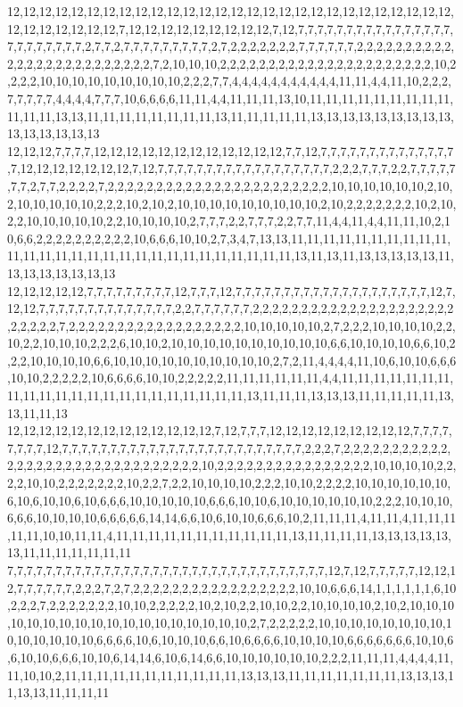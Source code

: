 12,12,12,12,12,12,12,12,12,12,12,12,12,12,12,12,12,12,12,12,12,12,12,12,12,12,12,12,12,12,12,12,12,12,12,7,12,12,12,12,12,12,12,12,12,7,12,7,7,7,7,7,7,7,7,7,7,7,7,7,7,7,7,7,7,7,7,7,7,7,7,2,7,7,2,7,7,7,7,7,7,7,7,7,2,7,2,2,2,2,2,2,2,7,7,7,7,7,7,2,2,2,2,2,2,2,2,2,2,2,2,2,2,2,2,2,2,2,2,2,2,2,2,2,7,2,10,10,10,2,2,2,2,2,2,2,2,2,2,2,2,2,2,2,2,2,2,2,2,2,2,10,2,2,2,2,10,10,10,10,10,10,10,10,10,2,2,2,7,7,4,4,4,4,4,4,4,4,4,4,4,11,11,4,4,11,10,2,2,2,7,7,7,7,7,4,4,4,4,7,7,7,10,6,6,6,6,11,11,4,4,11,11,11,13,10,11,11,11,11,11,11,11,11,11,11,11,11,13,13,11,11,11,11,11,11,11,11,13,11,11,11,11,11,13,13,13,13,13,13,13,13,13,13,13,13,13,13,13
12,12,12,7,7,7,7,12,12,12,12,12,12,12,12,12,12,12,12,7,7,12,7,7,7,7,7,7,7,7,7,7,7,7,7,7,7,12,12,12,12,12,12,12,7,12,7,7,7,7,7,7,7,7,7,7,7,7,7,7,7,7,7,7,2,2,2,7,7,7,2,2,7,7,7,7,7,7,7,2,7,7,2,2,2,2,7,2,2,2,2,2,2,2,2,2,2,2,2,2,2,2,2,2,2,2,2,2,2,2,10,10,10,10,10,10,2,10,2,10,10,10,10,10,2,2,2,10,2,10,2,10,10,10,10,10,10,10,10,10,2,10,2,2,2,2,2,2,2,10,2,10,2,2,10,10,10,10,10,2,2,10,10,10,10,2,7,7,7,2,2,7,7,7,2,2,7,7,11,4,4,11,4,4,11,11,10,2,10,6,6,2,2,2,2,2,2,2,2,2,2,10,6,6,6,10,10,2,7,3,4,7,13,13,11,11,11,11,11,11,11,11,11,11,11,11,11,11,11,11,11,11,11,11,11,11,11,11,11,11,11,11,13,11,13,11,13,13,13,13,13,11,13,13,13,13,13,13,13
12,12,12,12,12,7,7,7,7,7,7,7,7,7,12,7,7,7,12,7,7,7,7,7,7,7,7,7,7,7,7,7,7,7,7,7,7,7,7,12,7,12,12,7,7,7,7,7,7,7,7,7,7,7,7,7,7,2,2,7,7,7,7,7,7,2,2,2,2,2,2,2,2,2,2,2,2,2,2,2,2,2,2,2,2,2,2,2,2,2,2,7,2,2,2,2,2,2,2,2,2,2,2,2,2,2,2,2,2,2,10,10,10,10,10,2,7,2,2,2,10,10,10,10,2,2,10,2,2,10,10,10,2,2,2,6,10,10,2,10,10,10,10,10,10,10,10,10,10,6,6,10,10,10,10,6,6,10,2,2,2,10,10,10,10,6,6,10,10,10,10,10,10,10,10,10,10,2,7,2,11,4,4,4,4,11,10,6,10,10,6,6,6,10,10,2,2,2,2,2,10,6,6,6,6,10,10,2,2,2,2,2,11,11,11,11,11,11,4,4,11,11,11,11,11,11,11,11,11,11,11,11,11,11,11,11,11,11,11,11,11,11,13,11,11,11,13,13,13,11,11,11,11,11,13,13,11,11,13
12,12,12,12,12,12,12,12,12,12,12,12,12,7,12,7,7,7,12,12,12,12,12,12,12,12,12,7,7,7,7,7,7,7,7,12,7,7,7,7,7,7,7,7,7,7,7,7,7,7,7,7,7,7,7,7,7,7,7,7,7,2,2,2,7,2,2,2,2,2,2,2,2,2,2,2,2,2,2,2,2,2,2,2,2,2,2,2,2,2,2,2,2,2,2,2,10,2,2,2,2,2,2,2,2,2,2,2,2,2,2,2,2,10,10,10,10,2,2,2,2,10,10,2,2,2,2,2,2,2,10,2,2,7,2,2,10,10,10,10,2,2,2,10,10,2,2,2,2,10,10,10,10,10,10,6,10,6,10,10,6,10,6,6,6,10,10,10,10,10,6,6,6,10,10,6,10,10,10,10,10,10,2,2,2,10,10,10,6,6,6,10,10,10,10,6,6,6,6,6,14,14,6,6,10,6,10,10,6,6,6,10,2,11,11,11,4,11,11,4,11,11,11,11,11,10,10,11,11,4,11,11,11,11,11,11,11,11,11,11,11,13,11,11,11,11,13,13,13,13,13,13,11,11,11,11,11,11,11
7,7,7,7,7,7,7,7,7,7,7,7,7,7,7,7,7,7,7,7,7,7,7,7,7,7,7,7,7,7,7,7,7,12,7,12,7,7,7,7,7,12,12,12,7,7,7,7,7,7,2,2,2,7,2,7,2,2,2,2,2,2,2,2,2,2,2,2,2,2,2,2,2,10,10,6,6,6,14,1,1,1,1,1,1,6,10,2,2,2,7,2,2,2,2,2,2,2,10,10,2,2,2,2,2,10,2,10,2,2,10,10,2,2,10,10,10,10,2,10,2,10,10,10,10,10,10,10,10,10,10,10,10,10,10,10,10,10,10,2,7,2,2,2,2,2,10,10,10,10,10,10,10,10,10,10,10,10,10,10,6,6,6,6,10,6,10,10,10,6,6,10,6,6,6,6,10,10,10,10,6,6,6,6,6,6,6,10,10,6,6,10,10,6,6,6,10,10,6,14,14,6,10,6,14,6,6,10,10,10,10,10,10,2,2,2,11,11,11,4,4,4,4,11,11,10,10,2,11,11,11,11,11,11,11,11,11,11,11,13,13,13,11,11,11,11,11,11,11,13,13,13,11,13,13,11,11,11,11
